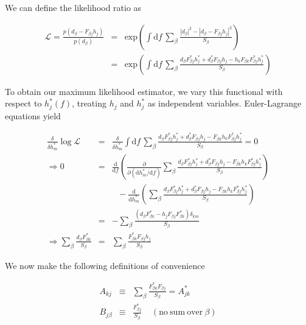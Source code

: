 \documentclass[10pt]{article}
\begin{document}
We can define the likelihood ratio as

\begin{eqnarray}
\mathcal{L} = \frac{p(d_\beta - F_{\beta j}h_j)}{p(d_\beta)} & = & \mathrm{exp}\left(\int\mathrm{d}f\, \sum_\beta \frac{\left|d_\beta\right|^2 - \left|d_\beta - F_{\beta j}h_j\right|^2}{S_\beta} \right) \\
                                              & = & \mathrm{exp}\left(\int\mathrm{d}f\, \sum_\beta \frac{d_\beta F_{\beta j}^\ast h_j^\ast + d_\beta^\ast F_{\beta j}h_j - h_kF_{\beta k} F_{\beta j}^\ast h_j^\ast}{S_\beta} \right)
\end{eqnarray}

To obtain our maximum likelihood estimator, we vary this functional with respect to $h_j^\ast(f)$, treating $h_j$ and $h_j^\ast$ as independent variables. Euler-Lagrange equations yield

\begin{eqnarray}
\frac{\delta}{\delta h_m^\ast} \log \mathcal{L} & = & \frac{\delta}{\delta h_m^\ast} \int\mathrm{d}f\, \sum_\beta \frac{d_\beta F_{\beta j}^\ast h_j^\ast + d_\beta^\ast F_{\beta j}h_j - F_{\beta k}h_k F_{\beta j}^\ast h_j^\ast}{S_\beta} = 0 \\
\Rightarrow 0 & = & \frac{\mathrm{d}}{\mathrm{d}f}\left(\frac{\partial}{\partial (\mathrm{d}h_m^\ast/\mathrm{d}f)} \sum_\beta \frac{d_\beta F_{\beta j}^\ast h_j^\ast + d_\beta^\ast F_{\beta j}h_j - F_{\beta k}h_k F_{\beta j}^\ast h_j^\ast}{S_\beta} \right) \nonumber \\
              &   &\ \ \  - \frac{\mathrm{d}}{\mathrm{d} h_m^\ast} \left( \sum_\beta \frac{d_\beta F_{\beta j}^\ast h_j^\ast + d_\beta^\ast F_{\beta j}h_j - F_{\beta k}h_k F_{\beta j}^\ast h_j^\ast}{S_\beta} \right) \\
              & = & - \sum_\beta \frac{\left(d_\beta F_{\beta k}^\ast - h_j F_{\beta j} F_{\beta k}^\ast\right)\delta_{km}}{S_\beta} \\
\Rightarrow \sum_\beta \frac{d_\beta F_{\beta k}^\ast}{S_\beta} & = & \sum_\beta \frac{F_{\beta k}^\ast F_{\beta j} h_j}{S_\beta}
\end{eqnarray}

We now make the following definitions of convenience

\begin{eqnarray}
A_{kj} & \equiv & \sum_\beta \frac{F_{\beta k}^\ast F_{\beta j}}{S_\beta} = A_{jk}^\ast \\
B_{j\beta} & \equiv & \frac{F_{\beta j}^\ast}{S_\beta}\ \ \ \ \ (\mathrm{no\ sum\ over}\ \beta)
\end{eqnarray}
\end{document}
